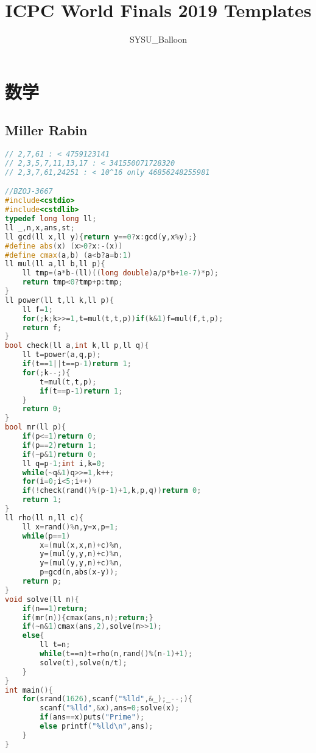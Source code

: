 \documentclass[landscape,a4paper]{article}
\begin{document}
\twocolumn
\setlength{\columnsep}{1.5cm}

\title{ICPC World Finals 2019 Templates}
\author {SYSU\_Balloon}
\maketitle
\thispagestyle{main}
\tableofcontents

\section{数学}

\subsection{Miller Rabin}
\begin{lstlisting}[language=C++]
// 2,7,61 : < 4759123141
// 2,3,5,7,11,13,17 : < 341550071728320
// 2,3,7,61,24251 : < 10^16 only 46856248255981

//BZOJ-3667
#include<cstdio>
#include<cstdlib>
typedef long long ll;
ll _,n,x,ans,st;
ll gcd(ll x,ll y){return y==0?x:gcd(y,x%y);}
#define abs(x) (x>0?x:-(x))
#define cmax(a,b) (a<b?a=b:1)
ll mul(ll a,ll b,ll p){
    ll tmp=(a*b-(ll)((long double)a/p*b+1e-7)*p);
    return tmp<0?tmp+p:tmp;
}
ll power(ll t,ll k,ll p){
    ll f=1;
    for(;k;k>>=1,t=mul(t,t,p))if(k&1)f=mul(f,t,p);
    return f;
}
bool check(ll a,int k,ll p,ll q){
    ll t=power(a,q,p);
    if(t==1||t==p-1)return 1;
    for(;k--;){
        t=mul(t,t,p);
        if(t==p-1)return 1;
    }
    return 0;
}
bool mr(ll p){
    if(p<=1)return 0;
    if(p==2)return 1;
    if(~p&1)return 0;
    ll q=p-1;int i,k=0;
    while(~q&1)q>>=1,k++;
    for(i=0;i<5;i++)
    if(!check(rand()%(p-1)+1,k,p,q))return 0;
    return 1;
}
ll rho(ll n,ll c){
    ll x=rand()%n,y=x,p=1;
    while(p==1)
        x=(mul(x,x,n)+c)%n,
        y=(mul(y,y,n)+c)%n,
        y=(mul(y,y,n)+c)%n,
        p=gcd(n,abs(x-y));
    return p;
}
void solve(ll n){
    if(n==1)return;
    if(mr(n)){cmax(ans,n);return;}
    if(~n&1)cmax(ans,2),solve(n>>1);
    else{
        ll t=n;
        while(t==n)t=rho(n,rand()%(n-1)+1);
        solve(t),solve(n/t);
    }
}
int main(){
    for(srand(1626),scanf("%lld",&_);_--;){
        scanf("%lld",&x),ans=0;solve(x);
        if(ans==x)puts("Prime");
        else printf("%lld\n",ans);
    }
}
\end{lstlisting}
\end{document}
